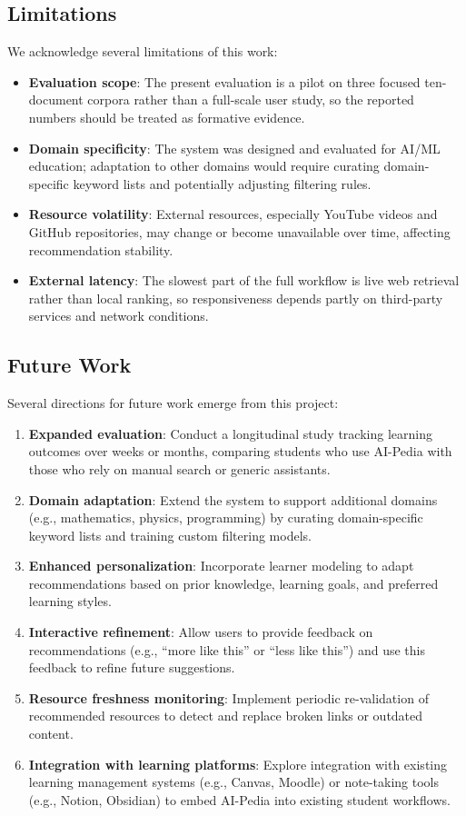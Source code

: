 \documentclass[10pt,journal,compsoc]{IEEEtran}
\begin{document}
\subsection{Limitations}

We acknowledge several limitations of this work:
\begin{itemize}
\item \textbf{Evaluation scope}: The present evaluation is a pilot on three focused ten-document corpora rather than a full-scale user study, so the reported numbers should be treated as formative evidence.
\item \textbf{Domain specificity}: The system was designed and evaluated for AI/ML education; adaptation to other domains would require curating domain-specific keyword lists and potentially adjusting filtering rules.
\item \textbf{Resource volatility}: External resources, especially YouTube videos and GitHub repositories, may change or become unavailable over time, affecting recommendation stability.
\item \textbf{External latency}: The slowest part of the full workflow is live web retrieval rather than local ranking, so responsiveness depends partly on third-party services and network conditions.
\end{itemize}

\subsection{Future Work}

Several directions for future work emerge from this project:
\begin{enumerate}
\item \textbf{Expanded evaluation}: Conduct a longitudinal study tracking learning outcomes over weeks or months, comparing students who use AI-Pedia with those who rely on manual search or generic assistants.
\item \textbf{Domain adaptation}: Extend the system to support additional domains (e.g., mathematics, physics, programming) by curating domain-specific keyword lists and training custom filtering models.
\item \textbf{Enhanced personalization}: Incorporate learner modeling to adapt recommendations based on prior knowledge, learning goals, and preferred learning styles.
\item \textbf{Interactive refinement}: Allow users to provide feedback on recommendations (e.g., ``more like this'' or ``less like this'') and use this feedback to refine future suggestions.
\item \textbf{Resource freshness monitoring}: Implement periodic re-validation of recommended resources to detect and replace broken links or outdated content.
\item \textbf{Integration with learning platforms}: Explore integration with existing learning management systems (e.g., Canvas, Moodle) or note-taking tools (e.g., Notion, Obsidian) to embed AI-Pedia into existing student workflows.
\end{enumerate}
\end{document}
